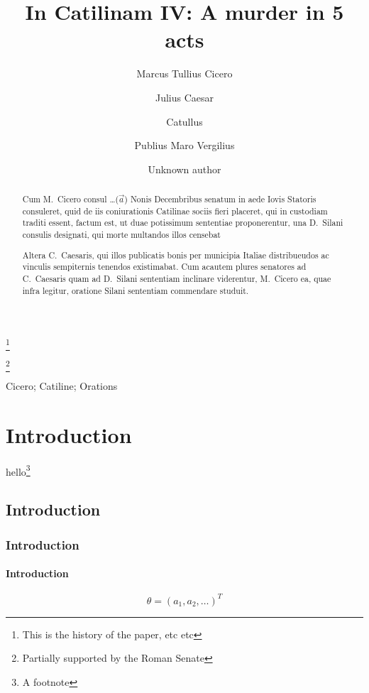 \documentclass{elsart}
\begin{document}
\begin{frontmatter}
\title{In Catilinam IV: A murder
in 5 acts}
\author[Paestum]{Marcus Tullius Cicero}
\author[Rome]{Julius Caesar}
\author[Rome]{Catullus}
\author[Baiae]{Publius Maro Vergilius}
\author[Paestum]{Unknown author}
\thanks[X]{This is the history of the paper, etc etc}

\address[Paestum]{Buckingham Palace, Paestum}
\address[Baiae]{The White House, Baiae}
\address[Rome]{Senate House, Rome}
\thanks[Someone]{Partially supported by the Roman Senate}
\begin{abstract}
Cum M.~Cicero consul {\boldmath \ldots ($\vec{a}$) } Nonis Decembribus senatum in aede
Iovis Statoris consuleret, quid de iis coniurationis Catilinae
sociis fieri placeret, qui in custodiam traditi essent, factum
est, ut duae potissimum sententiae proponerentur, 
una D.~Silani consulis
designati, qui morte multandos illos censebat

Altera C.~Caesaris, qui illos publicatis bonis per municipia
Italiae distribueudos ac vinculis sempiternis tenendos existimabat. Cum
acautem plures senatores ad C.~Caesaris quam ad
D.~Silani sententiam inclinare viderentur, M.~Cicero ea, quae
infra legitur, oratione Silani sententiam commendare studuit.
\end{abstract}
\begin{keyword}
Cicero; Catiline;
Orations
\end{keyword}
\end{frontmatter}

\section{Introduction}
hello\footnote{A footnote}
\subsection{Introduction}
\subsubsection{Introduction}
\paragraph{Introduction}

\begin{equation}\label{fo:theta}
  \theta = (a_{1},a_{2},\ldots)^{T}
\end{equation}
\end{document}
